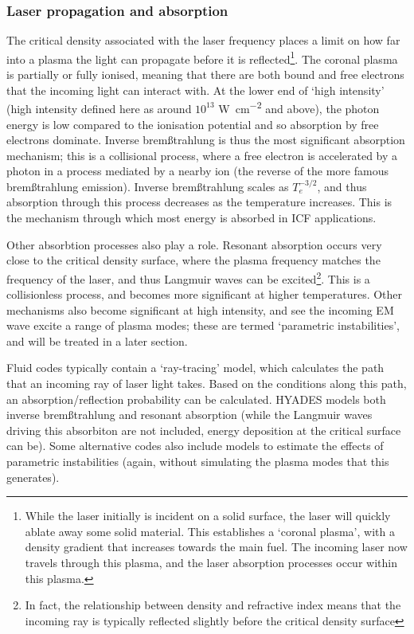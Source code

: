 \subsubsection{Laser propagation and absorption}
The critical density  associated with the laser frequency places a limit on how far into a plasma the light can propagate before it is reflected\footnote{While the laser initially is incident on a solid surface, the laser will quickly ablate away some solid material. This establishes a `coronal plasma', with a density gradient that increases towards the main fuel. The incoming laser now travels through this plasma, and the laser absorption processes occur within this plasma.}. The coronal plasma is partially or fully ionised, meaning that there are both bound and free electrons that the incoming light can interact with. At the lower end of `high intensity' (high intensity defined here as around $10^{13}$ \unit{\watt\per\centi\meter\squared} and above), the photon energy is low compared to the ionisation potential and so absorption by free electrons dominate. Inverse brem{\ss}trahlung is thus the most significant absorption mechanism; this is a collisional process, where a free electron is accelerated by a photon in a process mediated by a nearby ion (the reverse of the more famous brem{\ss}trahlung emission). Inverse brem{\ss}trahlung scales as $T_e^{-3/2}$, and thus absorption through this process decreases as the temperature increases. This is the mechanism through which most energy is absorbed in ICF applications.

Other absorbtion processes also play a role. Resonant absorption occurs very close to the critical density surface, where the plasma frequency matches the frequency of the laser, and thus Langmuir waves can be excited\footnote{In fact, the relationship between density and refractive index means that the incoming ray is typically reflected slightly before the critical density surface}. This is a collisionless process, and becomes more significant at higher temperatures. Other mechanisms also become significant at high intensity, and see the incoming EM wave excite a range of plasma modes; these are termed `parametric instabilities', and will be treated in a later section.

Fluid codes typically contain a `ray-tracing' model, which calculates the path that an incoming ray of laser light takes. Based on the conditions along this path, an absorption/reflection probability can be calculated. HYADES models both inverse brem{\ss}trahlung and resonant absorption (while the Langmuir waves driving this absorbiton are not included, energy deposition at the critical surface can be). Some alternative codes also include models to estimate the effects of parametric instabilities (again, without simulating the plasma modes that this generates).

